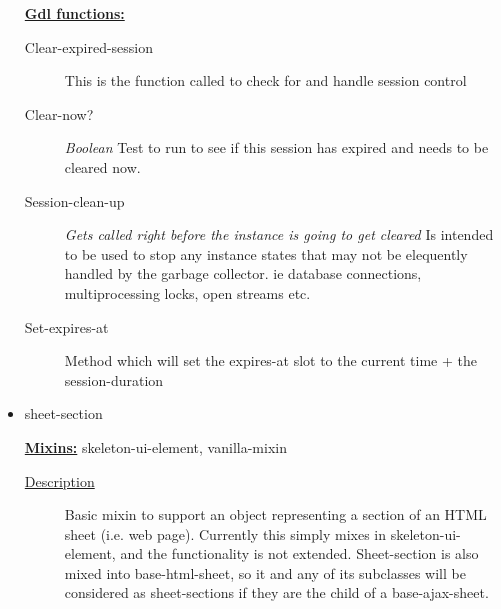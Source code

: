 \documentclass [11pt]{book}
\begin{document}
\begin{itemize}
\textbf{
\underline{Gdl functions:}}

\begin{description}

\item [Clear-expired-session]
This is the function called to check for and handle session control


\item [Clear-now?]
\emph{Boolean} Test to run to see if this session has expired and needs to be cleared now.


\item [Session-clean-up]
\emph{Gets called right before the instance is going to get cleared} Is intended to be used to stop any instance states that may not be elequently handled by the garbage collector. ie database connections, multiprocessing locks, open streams etc.


\item [Set-expires-at]
Method which will set the expires-at slot to the current time + the session-duration


\end{description}







\item {}sheet-section


\textbf{
\underline{Mixins:}} skeleton-ui-element, vanilla-mixin





\begin{description}

\item [
\underline{Description}]


Basic mixin to support an object 
representing a section of an HTML sheet (i.e. web page). Currently 
this simply mixes in skeleton-ui-element, and the functionality is not 
extended. Sheet-section is also mixed into base-html-sheet, so it and 
any of its subclasses will be considered as sheet-sections if they 
are the child of a base-ajax-sheet.





\end{description}





\end{itemize}
\end{document}

